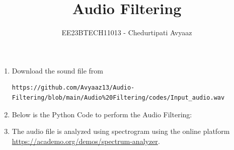 \documentclass[journal,12pt,twocolumn]{IEEEtran}
\theoremstyle{remark}
\renewcommand\thesection{\arabic{section}}
\numberwithin{equation}{subsection}
\begin{document}

\vspace{3cm}
\title{Audio Filtering}
\author{EE23BTECH11013 - Chedurtipati Avyaaz
}
\maketitle
\newpage
\bigskip
\renewcommand{\thefigure}{\arabic{figure}}
\renewcommand{\thetable}{\arabic{figure}}



\tableofcontents

\begin{enumerate}[label=\thesection.\arabic*
,ref=\thesection.\theenumi]
\section{Digital Filter}
\label{input_sound}
\item Download the sound file from
\begin{lstlisting}
https://github.com/Avyaaz13/Audio-Filtering/blob/main/Audio%20Filtering/codes/Input_audio.wav
\end{lstlisting}
\item 
\label{Python code}
Below is the Python Code to perform the Audio Filtering:
\label{py:audio_filter}

\item 
\label{Visualization}

The audio file is analyzed using spectrogram using the online platform \label{prob:spectrogram}\href{https://academo.org/demos/spectrum-analyzer}{\url{https://academo.org/demos/spectrum-analyzer}}.


\end{enumerate}
\end{document}
